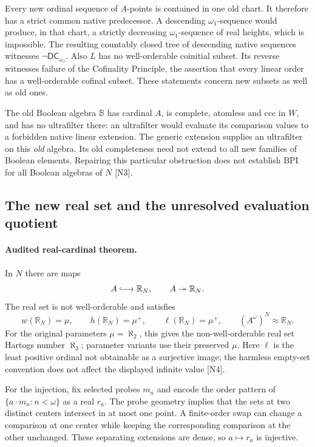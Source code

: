 Every new ordinal sequence of $A$-points is contained in one old chart.
It therefore has a strict common native predecessor.  A descending
$\omega_1$-sequence would produce, in that chart, a strictly decreasing
$\omega_1$-sequence of real heights, which is impossible.  The resulting
countably closed tree of descending native sequences witnesses
$\neg\mathsf{DC}_{\omega_1}$.  Also $L$ has no well-orderable coinitial
subset.  Its reverse witnesses failure of the Cofinality Principle,
the assertion that every linear order has a well-orderable cofinal
subset.  These statements concern new subsets as well as old ones.

The old Boolean algebra $\mathbb B$ has cardinal $A$, is complete,
atomless and ccc in $W$, and has no ultrafilter there: an ultrafilter
would evaluate its comparison values to a forbidden native linear
extension.  The generic extension supplies an ultrafilter on this
\emph{old} algebra.  Its old completeness need not extend to all new
families of Boolean elements.  Repairing this particular obstruction
does not establish BPI for all Boolean algebras of $N$ [N3].

\subsection{The new real set and the unresolved evaluation quotient}

\paragraph{Audited real-cardinal theorem.}
In $N$ there are maps
\[
            A\lhook\joinrel\longrightarrow\mathbb R_N,
       \qquad A\twoheadrightarrow\mathbb R_N.
\]
The real set is not well-orderable and satisfies
\[
 w(\mathbb R_N)=\mu,\qquad h(\mathbb R_N)=\mu^+,
 \qquad \ell(\mathbb R_N)=\mu^+,
 \qquad (A^\omega)^N\approx\mathbb R_N.
\]
For the original parameters $\mu=\aleph_2$, this gives the non-well-orderable
real set Hartogs number $\aleph_3$; parameter variants use their preserved
$\mu$.  Here $\ell$ is the least positive ordinal not obtainable as a
surjective image; the harmless empty-set convention does not affect
the displayed infinite value [N4].

For the injection, fix selected probes $m_n$ and encode the order
pattern of $\{a\cdot m_n:n<\omega\}$ as a real $r_a$.
The probe geometry implies that the sets at two distinct centers
intersect in at most one point.  A finite-order swap can change a
comparison at one center while keeping the corresponding comparison
at the other unchanged.  These separating extensions are dense, so
$a\mapsto r_a$ is injective.

